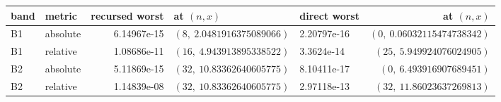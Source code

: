 \begin{tabular}{llrllr}
\toprule
band & metric & recursed worst & at $(n,x)$ & direct worst & at $(n,x)$\\
\midrule
B1 & absolute & 6.14967e-15 & $(8,\ 2.0481916375089066)$ & 2.20797e-16 & $(0,\ 0.06032115474738342)$\\
B1 & relative & 1.08686e-11 & $(16,\ 4.943913895338522)$ & 3.3624e-14 & $(25,\ 5.949924076024905)$\\
B2 & absolute & 5.11869e-15 & $(32,\ 10.83362640605775)$ & 8.10411e-17 & $(0,\ 6.493916907689451)$\\
B2 & relative & 1.14839e-08 & $(32,\ 10.83362640605775)$ & 2.97118e-13 & $(32,\ 11.86023637269813)$\\
\bottomrule
\end{tabular}
